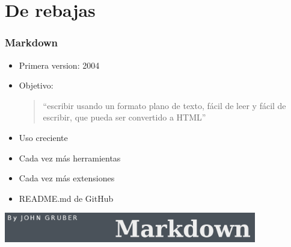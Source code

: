 %
%

\section{De rebajas}

\begin{frame}
\frametitle{Markdown}

{\Large
\begin{itemize}
\item Primera version: 2004
\item Objetivo:
  \begin{quote}
  ``escribir usando un formato plano de texto, fácil de leer y fácil de escribir, que pueda ser convertido a HTML''
  \end{quote}
\item Uso creciente
\item Cada vez más herramientas
\item Cada vez más extensiones
\item README.md de GitHub
\end{itemize}
}

\begin{center}
\includegraphics[width=11cm]{figs/markdown-logo}
\end{center}

\end{frame}


